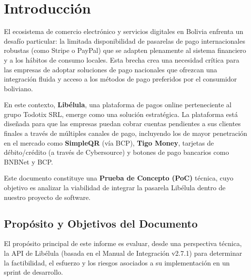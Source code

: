 \section{Introducción}
    El ecosistema de comercio electrónico y servicios digitales en Bolivia enfrenta un desafío particular: la limitada 
    disponibilidad de pasarelas de pago internacionales robustas (como Stripe o PayPal) que se adapten plenamente al sistema 
    financiero y a los hábitos de consumo locales. Esta brecha crea una necesidad crítica para las empresas de adoptar soluciones 
    de pago nacionales que ofrezcan una integración fluida y acceso a los métodos de pago preferidos por el consumidor boliviano.\par

    En este contexto, \textbf{Libélula}, una plataforma de pagos online perteneciente al grupo Todotix SRL, emerge como una solución 
    estratégica. La plataforma está diseñada para que las empresas puedan cobrar cuentas pendientes a sus clientes finales a través 
    de múltiples canales de pago, incluyendo los de mayor penetración en el mercado como \textbf{SimpleQR} (vía BCP), \textbf{Tigo Money}, 
    tarjetas de débito/crédito (a través de Cybersource) y botones de pago bancarios como BNBNet y BCP.\par

    Este documento constituye una \textbf{Prueba de Concepto (PoC)} técnica, cuyo objetivo es analizar la viabilidad de 
    integrar la pasarela Libélula dentro de nuestro proyecto de software.\par

    \subsection{Propósito y Objetivos del Documento}
        El propósito principal de este informe es evaluar, desde una perspectiva técnica, la API de Libélula (basada en el 
        Manual de Integración v2.7.1) para determinar la factibilidad, el esfuerzo y los riesgos asociados a su implementación 
        en un sprint de desarrollo.\par

